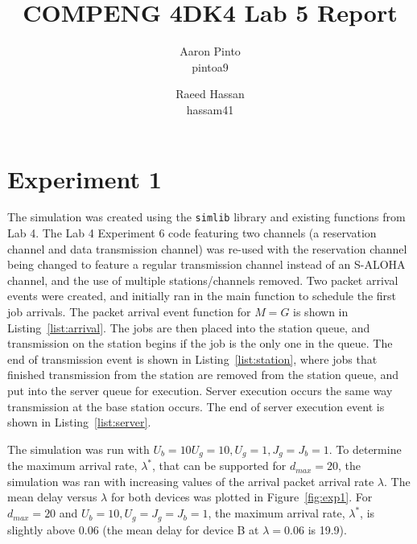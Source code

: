 \documentclass[12pt]{article}
\title{COMPENG 4DK4 Lab 5 Report}
\author{
    Aaron Pinto \\
    pintoa9 \\
    \and
    Raeed Hassan \\
    hassam41 \\
}
\begin{document}
\maketitle
\clearpage



\section*{Experiment 1}

The simulation was created using the \texttt{simlib} library and existing functions from Lab 4. The Lab 4 Experiment 6 code featuring two channels (a reservation channel and data transmission channel) was re-used with the reservation channel being changed to feature a regular transmission channel instead of an S-ALOHA channel, and the use of multiple stations/channels removed. Two packet arrival events were created, and initially ran in the main function to schedule the first job arrivals. The packet arrival event function for $M = G$ is shown in Listing~\ref{list:arrival}. The jobs are then placed into the station queue, and transmission on the station begins if the job is the only one in the queue. The end of transmission event is shown in Listing~\ref{list:station}, where jobs that finished transmission from the station are removed from the station queue, and put into the server queue for execution. Server execution occurs the same way transmission at the base station occurs. The end of server execution event is shown in Listing~\ref{list:server}.

The simulation was run with $U_b = 10U_g = 10, U_g = 1, J_g = J_b = 1$. To determine the maximum arrival rate, $\lambda^*$, that can be supported for $d_{max} = 20$, the simulation was ran with increasing values of the arrival packet arrival rate $\lambda$. The mean delay versus $\lambda$ for both devices was plotted in Figure~\ref{fig:exp1}. For $d_{max} = 20$ and $U_b = 10, U_g = J_g = J_b = 1$, the maximum arrival rate, $\lambda^*$, is slightly above 0.06 (the mean delay for device B at $\lambda = 0.06$ is 19.9).
\end{document}
